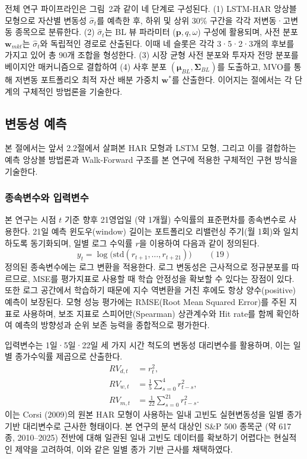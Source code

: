 \documentclass{article}
\begin{document}
전체 연구 파이프라인은 그림~2과 같이 네 단계로 구성된다. (1) LSTM-HAR 앙상블 모형으로 자산별 변동성 $\hat{\sigma}_t$를 예측한 후, 하위 및 상위 30\% 구간을 각각 저변동·고변동 종목으로 분류한다. (2) $\hat{\sigma}_t$는 BL 뷰 파라미터 ($\mathbf{p}, q, \omega$) 구성에 활용되며, 사전 분포 $\mathbf{w}_{mkt}$는 $\hat{\sigma}_t$와 독립적인 경로로 산출된다. 이때 네 슬롯은 각각 3·5·2·3개의 후보를 가지고 있어 총 90개 조합을 형성한다. (3) 시장 균형 사전 분포와 투자자 전망 분포를 베이지안 매커니즘으로 결합하여 (4) 사후 분포 $(\boldsymbol{\mu}_{BL}, \boldsymbol{\Sigma}_{BL})$를 도출하고, MVO를 통해 저변동 포트폴리오 최적 자산 배분 가중치 $\mathbf{w}^*$를 산출한다. 이어지는 절에서는 각 단계의 구체적인 방법론을 기술한다.

\subsection{변동성 예측}\label{subsec:vol_pred}

본 절에서는 앞서 2.2절에서 살펴본 HAR 모형과 LSTM 모형, 그리고 이를 결합하는 예측 앙상블 방법론과 Walk-Forward 구조를 본 연구에 적용한 구체적인 구현 방식을 기술한다.

\subsubsection{종속변수와 입력변수}\label{subsubsec:variable}
본 연구는 시점 $t$ 기준 향후 21영업일 (약 1개월) 수익률의 표준편차를 종속변수로 사용한다. 21일 예측 윈도우(window) 길이는 포트폴리오 리밸런싱 주기(월 1회)와 일치하도록 동기화되며, 일별 로그 수익률 $r$을 이용하여 다음과 같이 정의된다.
\begin{equation}
y_t = \log\bigl(\mathrm{std}(r_{t+1}, \ldots, r_{t+21})\bigr) \qquad(19)\end{equation}
정의된 종속변수에는 로그 변환을 적용한다. 로그 변동성은 근사적으로 정규분포를 따르므로, MSE를 평가지표로 사용할 때 학습 안정성을 확보할 수 있다는 장점이 있다. 또한 로그 공간에서 학습하기 때문에 지수 역변환을 거친 후에도 항상 양수(positive) 예측이 보장된다. 모형 성능 평가에는 RMSE(Root Mean Squared Error)를 주된 지표로 사용하며, 보조 지표로 스피어만(Spearman) 상관계수와 Hit rate를 함께 확인하여 예측의 방향성과 순위 보존 능력을 종합적으로 평가한다.

입력변수는 1일·5일·22일 세 가지 시간 척도의 변동성 대리변수를 활용하며, 이는 일별 종가수익률 제곱으로 산출한다.
\begin{align}
RV_{d,t} &= r_t^2,\\
RV_{w,t} &= \frac{1}{5}\sum_{s=0}^{4} r_{t-s}^2,\\
RV_{m,t} &= \frac{1}{22}\sum_{s=0}^{21} r_{t-s}^2.
\end{align}
이는 Corsi (2009)의 원본 HAR 모형이 사용하는 일내 고빈도 실현변동성을 일별 종가 기반 대리변수로 근사한 형태이다. 본 연구의 분석 대상인 S\&P 500 종목군 (약 617 종, 2010--2025) 전반에 대해 일관된 일내 고빈도 데이터를 확보하기 어렵다는 현실적인 제약을 고려하여, 이와 같은 일별 종가 기반 근사를 채택하였다.
\end{document}
